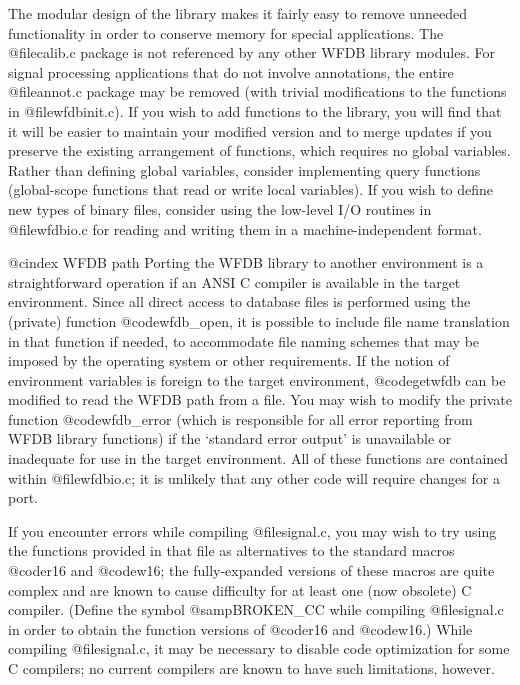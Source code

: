 {{{{{{{{{The modular design of the library makes it fairly easy to remove
unneeded functionality in order to conserve memory for special
applications.  The @file{calib.c} package is not referenced by any other
WFDB library modules.  For signal processing applications that do not involve
annotations, the entire @file{annot.c} package may be removed (with trivial
modifications to the functions in @file{wfdbinit.c}).  If you wish to add
functions to the library, you will find that it will be easier to
maintain your modified version and to merge updates if you preserve the
existing arrangement of functions, which requires no global variables.
Rather than defining global variables, consider implementing query
functions (global-scope functions that read or write local
variables).  If you wish to define new types of binary files, consider
using the low-level I/O routines in @file{wfdbio.c} for reading and writing
them in a machine-independent format.

@cindex WFDB path
Porting the WFDB library to another environment is a straightforward
operation if an ANSI C compiler is available in the target environment.
Since all direct access to database files is performed using the
(private) function @code{wfdb_open}, it is possible to include file name
translation in that function if needed, to accommodate file naming
schemes that may be imposed by the operating system or other
requirements.  If the notion of environment variables is foreign to the
target environment, @code{getwfdb} can be modified to read the WFDB path
from a file.  You may wish to modify the private function
@code{wfdb_error} (which is responsible for all error reporting from WFDB
library functions) if the `standard error output' is unavailable or
inadequate for use in the target environment.  All of these functions are
contained within @file{wfdbio.c}; it is unlikely that any other code will
require changes for a port.

If you encounter errors while compiling @file{signal.c}, you may wish to try
using the functions provided in that file as alternatives to the standard
macros @code{r16} and @code{w16}; the fully-expanded versions of these macros
are quite complex and are known to cause difficulty for at least one (now
obsolete) C compiler.  (Define the symbol @samp{BROKEN_CC} while compiling
@file{signal.c} in order to obtain the function versions of @code{r16} and
@code{w16}.)  While compiling @file{signal.c}, it may be necessary to disable
code optimization for some C compilers;  no current compilers are known to
have such limitations, however.

}}}}}}}}}
